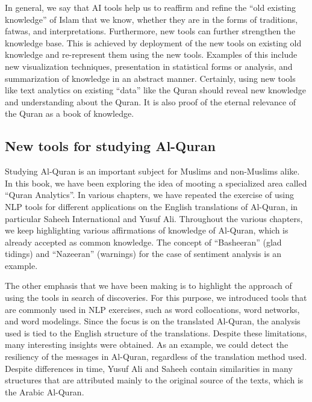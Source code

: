 \documentclass[
]{article}
\begin{document}
In general, we say that AI tools help us to reaffirm and refine the ``old existing knowledge'' of Islam that we know, whether they are in the forms of traditions, fatwas, and interpretations. Furthermore, new tools can further strengthen the knowledge base. This is achieved by deployment of the new tools on existing old knowledge and re-represent them using the new tools. Examples of this include new visualization techniques, presentation in statistical forms or analysis, and summarization of knowledge in an abstract manner. Certainly, using new tools like
text analytics on existing ``data'' like the Quran should reveal new knowledge and understanding about the Quran. It is also proof of the eternal relevance of the Quran as a book of knowledge.

\hypertarget{new-tools-for-studying-al-quran}{%
\subsection*{New tools for studying Al-Quran}\label{new-tools-for-studying-al-quran}}

Studying Al-Quran is an important subject for Muslims and non-Muslims alike. In this book, we have been exploring the idea of mooting a specialized area called ``Quran Analytics''. In various chapters, we have repeated the exercise of using NLP tools for different applications on the English translations of Al-Quran, in particular Saheeh International and Yusuf Ali. Throughout the various chapters, we keep highlighting various affirmations of knowledge of Al-Quran, which is already accepted as common knowledge. The concept of ``Basheeran'' (glad tidings) and ``Nazeeran'' (warnings) for the case of sentiment analysis is an example.

The other emphasis that we have been making is to highlight the approach of using the tools in search of discoveries. For this purpose, we introduced tools that are commonly used in NLP exercises, such as word collocations, word networks, and word modelings. Since the focus is on the translated Al-Quran, the analysis used is tied to the English structure of the translations. Despite these limitations, many interesting insights were obtained. As an example, we could detect the resiliency of the messages in Al-Quran, regardless of the translation method used. Despite differences in time, Yusuf Ali and Saheeh contain similarities in many structures that are attributed mainly to the original source of the texts, which is the Arabic Al-Quran.
\end{document}
